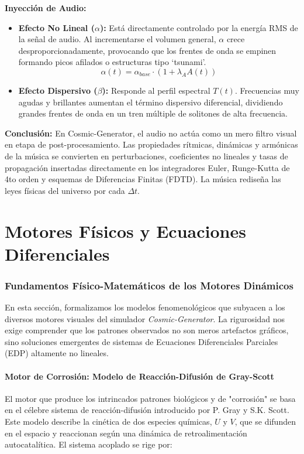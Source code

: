 \documentclass[12pt, openany]{book}
\begin{document}
\textbf{Inyección de Audio:}
\begin{itemize}
    \item \textbf{Efecto No Lineal ($\alpha$):} Está directamente controlado por la energía RMS de la señal de audio. Al incrementarse el volumen general, $\alpha$ crece desproporcionadamente, provocando que los frentes de onda se empinen formando picos afilados o estructuras tipo `tsunami'.
    $$\alpha(t) = \alpha_{base} \cdot (1 + \lambda_A A(t))$$
    \item \textbf{Efecto Dispersivo ($\beta$):} Responde al perfil espectral $T(t)$. Frecuencias muy agudas y brillantes aumentan el término dispersivo diferencial, dividiendo grandes frentes de onda en un tren múltiple de solitones de alta frecuencia.
\end{itemize}

\vspace{0.5cm}
\textbf{Conclusión:}
En Cosmic-Generator, el audio no actúa como un mero filtro visual en etapa de post-procesamiento. Las propiedades rítmicas, dinámicas y armónicas de la música se convierten en perturbaciones, coeficientes no lineales y tasas de propagación insertadas directamente en los integradores Euler, Runge-Kutta de 4to orden y esquemas de Diferencias Finitas (FDTD). La música rediseña las leyes físicas del universo por cada $\Delta t$.

\part{Motores Físicos y Ecuaciones Diferenciales}

\section{Fundamentos Físico-Matemáticos de los Motores Dinámicos}
\label{sec:fundamentos_motores}

En esta sección, formalizamos los modelos fenomenológicos que subyacen a los diversos motores visuales del simulador \textit{Cosmic-Generator}. La rigurosidad nos exige comprender que los patrones observados no son meros artefactos gráficos, sino soluciones emergentes de sistemas de Ecuaciones Diferenciales Parciales (EDP) altamente no lineales.

\subsection{Motor de Corrosión: Modelo de Reacción-Difusión de Gray-Scott}
El motor que produce los intrincados patrones biológicos y de "corrosión" se basa en el célebre sistema de reacción-difusión introducido por P. Gray y S.K. Scott. Este modelo describe la cinética de dos especies químicas, $U$ y $V$, que se difunden en el espacio y reaccionan según una dinámica de retroalimentación autocatalítica. El sistema acoplado se rige por:
\end{document}
